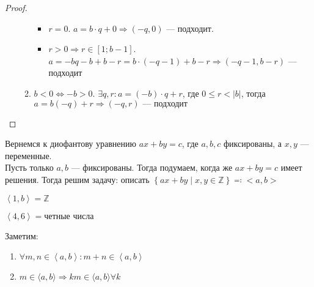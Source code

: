 \begin{proof}
\begin{itemize}
\begin{enumerate}[label=\Roman*.,ref=\arabic*]
\begin{itemize}
                \item $r = 0$.  $a = b \cdot q + 0 \Rightarrow (-q, 0)$ --- подходит.
                \item  $r > 0 \Rightarrow r \in \left[1; b - 1\right]$.  $a = -bq -b + b -r = b \cdot (-q -1) + b - r \Rightarrow \left( -q -1, b-r\right)$ --- подходит
            \end{itemize}
        \item $b < 0 \iff -b > 0$.  $\exists q, r: a = (-b) \cdot q + r$, где  $0 \le r < |b|$, тогда $a = b(-q) +r \Rightarrow (-q, r)\text{ --- подходит}$
        \end{enumerate}
    \end{itemize}
\end{proof}

Вернемся к диофантову уравнению $ax+by=c$, где  $a,b,c$ фиксированы, а  $x, y$ --- переменные. \\
Пусть только  $a, b$ --- фиксированы. Тогда подумаем, когда же  $ax + by = c$ имеет решения. Тогда решим задачу: описать $\left\{ ax+by \; \vert \; x,y \in \mathbb{Z} \right\} \eqqcolon <a, b>$
 \begin{example}
     $\left<1,b\right> = \mathbb{Z}$ \\
\end{example}
\begin{example}
         $\left<4, 6\right> = \text{четные числа}$ 
\end{example}
Заметим: 
\begin{enumerate}
    \item
        $\forall m, n \in \left<a,b\right>\!: m + n \in\left<a,b\right>$
    \item
        $m \in \langle a,b \rangle \Rightarrow km \in \langle a,b \rangle \forall k$
\end{enumerate}

